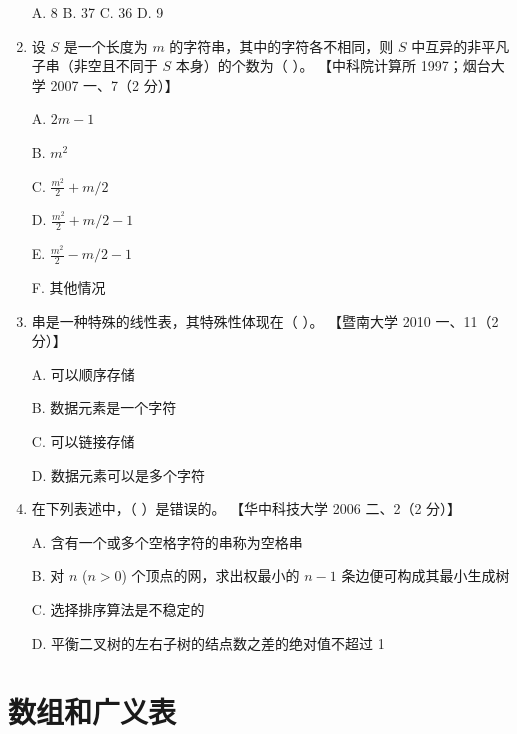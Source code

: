 \documentclass[lang=cn,newtx,10pt,scheme=chinese]{../../elegantbook}
\begin{document}
\begin{enumerate}
       A. 8 \quad B. 37 \quad C. 36 \quad D. 9  
   
       \item 设 $S$ 是一个长度为 $m$ 的字符串，其中的字符各不相同，则 $S$ 中互异的非平凡子串（非空且不同于 $S$ 本身）的个数为（ ）。  
       【中科院计算所 1997；烟台大学 2007 一、7（2 分）】  

       A. $2m - 1$  

       B. $m^2$  

       C. $\frac{m^2}{2} + m/2$  

       D. $\frac{m^2}{2} + m/2 - 1$  

       E. $\frac{m^2}{2} - m/2 - 1$  

       F. 其他情况  
   
       \item 串是一种特殊的线性表，其特殊性体现在（ ）。  
       【暨南大学 2010 一、11（2 分）】  

       A. 可以顺序存储  

       B. 数据元素是一个字符  

       C. 可以链接存储  

       D. 数据元素可以是多个字符  
   
       \item 在下列表述中，（ ）是错误的。  
       【华中科技大学 2006 二、2（2 分）】  


       A. 含有一个或多个空格字符的串称为空格串  

       B. 对 $n$ ($n > 0$) 个顶点的网，求出权最小的 $n-1$ 条边便可构成其最小生成树  

       C. 选择排序算法是不稳定的  

       D. 平衡二叉树的左右子树的结点数之差的绝对值不超过 1  
\end{enumerate}

\chapter{数组和广义表}
\end{document}
